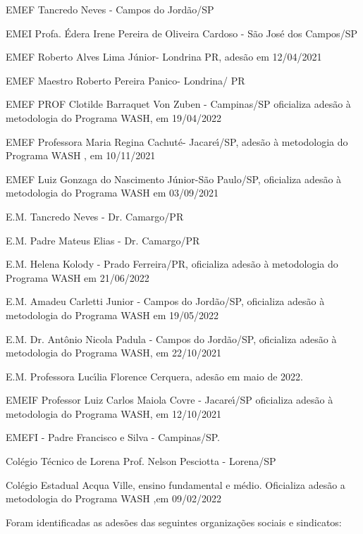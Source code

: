 \documentclass[
12pt,		%
openright,	%
twoside,  %
a4paper,			%
chapter=TITLE,		%
english,			%
french,				%
spanish,			%
brazil				%
]{USPSC-classe/USPSC}
\begin{document}
\begin{alineas}
\item EMEF Tancredo Neves - Campos do Jord\~ao/SP
\item EMEI Profa. \'Edera Irene Pereira de Oliveira Cardoso - S\~ao Jos\'e dos Campos/SP
\item EMEF Roberto Alves Lima J\'unior- Londrina PR, ades\~ao em 12/04/2021
\item EMEF Maestro Roberto Pereira Panico- Londrina/ PR
\item EMEF PROF Clotilde Barraquet Von Zuben - Campinas/SP oficializa ades\~ao \`a metodologia do Programa WASH, em 19/04/2022
\item EMEF Professora Maria Regina Cachut\'e- Jacare\'{\i}/SP, ades\~ao \`a metodologia do Programa WASH , em 10/11/2021
\item EMEF Luiz Gonzaga do Nascimento J\'unior-S\~ao Paulo/SP, oficializa ades\~ao \`a metodologia do Programa WASH em 03/09/2021
\item E.M. Tancredo Neves - Dr. Camargo/PR
\item E.M. Padre Mateus Elias - Dr. Camargo/PR
\item E.M. Helena Kolody - Prado Ferreira/PR, oficializa ades\~ao \`a metodologia do Programa WASH em 21/06/2022
\item E.M. Amadeu Carletti Junior - Campos do Jord\~ao/SP, oficializa ades\~ao \`a metodologia do Programa WASH em 19/05/2022
\item E.M. Dr. Ant\^onio Nicola Padula - Campos do Jord\~ao/SP, oficializa ades\~ao \`a metodologia do Programa WASH,  em 22/10/2021
\item E.M. Professora Luc\'{\i}lia Florence Cerquera, ades\~ao em maio de 2022.
\item EMEIF Professor Luiz Carlos Maiola Covre - Jacare\'{\i}/SP oficializa ades\~ao \`a metodologia do Programa WASH, em 12/10/2021
\item EMEFI -  Padre Francisco e Silva - Campinas/SP.
\item Col\'egio T\'ecnico de Lorena Prof. Nelson Pesciotta - Lorena/SP
\item Col\'egio  Estadual Acqua Ville, ensino fundamental e  m\'edio.  Oficializa ades\~ao a metodologia do Programa WASH ,em 09/02/2022
\end{alineas}

Foram identificadas as ades\~oes das seguintes organiza\c{c}\~oes sociais e sindicatos:
\end{document}
